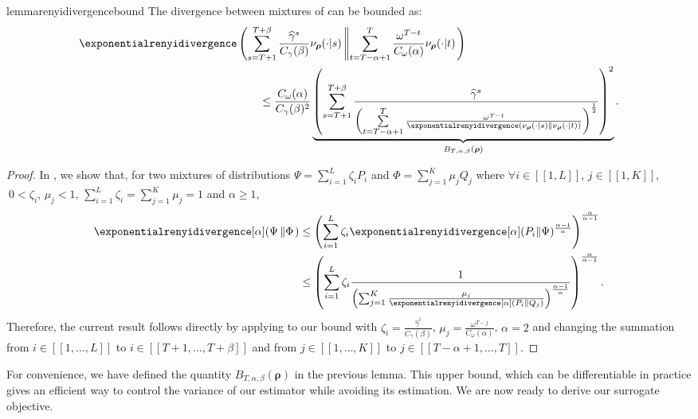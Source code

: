 \begin{restatable}{lemma}{renyidivergencebound}
\label{pp:divergence_bound}
    The divergence between mixtures of  can be bounded as:
\begin{align*}
    \exponentialrenyidivergence & \left( \sum_{s=T+1}^{T+\beta} \frac{\widehat{\gamma}^s}{C_\gamma(\beta)} \nu_{\boldsymbol\rho}(\cdot\vert s) \left\Vert  \sum_{t=T-\alpha+1}^{T} \frac{\omega^{T-t} }{C_\omega(\alpha)}\nu_{\boldsymbol\rho}(\cdot\vert t)  \right.\right) 
    \\
    & \qquad \le \frac{C_\omega(\alpha)}{C_\gamma(\beta)^2} \underbrace{\left(\sum_{s=T+1}^{T+\beta} \frac{\widehat{\gamma}^{s}}{\left(\sum\limits_{ t=T-\alpha+1}^{ T}\frac{\omega^{T-t}}{\exponentialrenyidivergence(\nu_{\boldsymbol\rho}(\cdot\vert s)\left\Vert \nu_{\boldsymbol\rho}(\cdot\vert t)\right)}\right)^{\frac{1}{2}}}\right)^2}_{{B}_{T,\alpha,\beta}(\boldsymbol\rho)}.
\end{align*}
\end{restatable}
\begin{proof} 
    In , we show that, for two mixtures of distributions $\textstyle\Psi = \sum_{i=1}^L \zeta_i P_i$ and $\textstyle\Phi = \sum_{j=1}^K \mu_j Q_j$ where $\forall i \in [\![1,L]\!]$, $j \in [\![1,K]\!]$, $\ 0<\zeta_i$, $\mu_j <1$, $\textstyle\sum_{i=1}^L \zeta_i = \sum_{j=1}^K \mu_j= 1$ and $\alpha\ge1$,
    \begin{align*}
        \exponentialrenyidivergence[\alpha](\Psi\left\Vert \Phi\right.) 
        &\leq 
        \left(\sum_{i=1}^L \zeta_i \exponentialrenyidivergence[\alpha](P_i\Vert \Psi)^{\frac{\alpha-1}{\alpha}}\right)^{\frac{\alpha}{\alpha-1}}\\
        &\leq 
        \left(\sum_{i=1}^L \zeta_i \frac{1}{\left(\sum_{j=1}^K\frac{\mu_j}{\exponentialrenyidivergence[\alpha]( P_i \Vert Q_j)}\right)^{\frac{\alpha-1}{\alpha}}}\right)^{\frac{\alpha}{\alpha-1}}.
    \end{align*}
    Therefore, the current result follows directly by applying  to our bound with $\textstyle\zeta_i=\frac{\widehat{\gamma}^i}{C_\gamma(\beta)}$, $\textstyle\mu_j = \frac{\omega^{T-j}}{C_\omega(\alpha)}$, $\alpha=2$ and changing the summation from $i\in[\![1,\dots,L]\!]$ to $i\in[\![T+1,\dots,T+\beta]\!]$ and from $j\in[\![1,\dots,K]\!]$ to $j\in[\![T-\alpha+1,\dots,T]\!]$.
\end{proof}

For convenience, we have defined the quantity ${B}_{T,\alpha,\beta}(\boldsymbol\rho)$ in the previous lemma.
This upper bound, which can be differentiable in practice gives an efficient way to control the variance of our estimator while avoiding its estimation.
We are now ready to derive our surrogate objective.  

